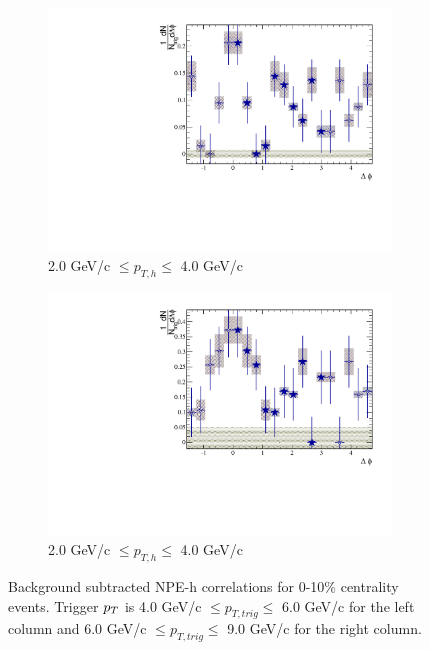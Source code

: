 \begin{figure}[htbp]
\begin{subfigure}{0.5\textwidth}
		\includegraphics[width=\textwidth]{Plots/Correlations/subtracted/NPE_eh_corr_subtracted_primpt_4_5_cent_7_8_assopt_3_4.pdf}
		\caption{2.0 GeV/c $\leq p_{T,h} \leq$ 4.0 GeV/c}
		\label{fig:Sub010e}
	\end{subfigure}	
	\begin{subfigure}{0.5\textwidth}
		\includegraphics[width=\textwidth]{Plots/Correlations/subtracted/NPE_eh_corr_subtracted_primpt_6_8_cent_7_8_assopt_3_4.pdf}
		\caption{2.0 GeV/c $\leq p_{T,h} \leq$ 4.0 GeV/c}
		\label{fig:Sub010f}
	\end{subfigure}	
\caption[Subtracted Correlations 0-10\% Centrality]{Background subtracted NPE-h correlations for 0-10\% centrality events. Trigger $p_{T}$ is 4.0 GeV/c $\leq p_{T,trig} \leq$ 6.0 GeV/c for the left column and 6.0 GeV/c $\leq p_{T,trig} \leq$ 9.0 GeV/c for the right column.}
\label{fig:Sub010}
\end{figure}

